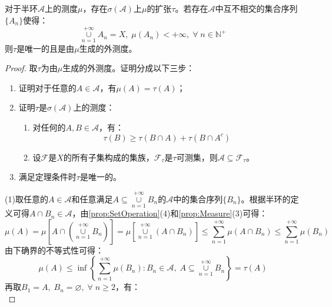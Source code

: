 \begin{theorem}\label{theo:SemiringMeasureExtension}
	对于半环$\mathscr{A}$上的测度$\mu$，存在$\sigma(\mathscr{A})$上$\mu$的扩张$\tau$。若存在$\mathscr{A}$中互不相交的集合序列$\{A_n\}$使得：
	\begin{equation*}
		\underset{n=1}{\overset{+\infty}{\cup}}A_n=X,\;\mu(A_n)<+\infty,\;\forall\;n\in\mathbb{N}^+
	\end{equation*}
	则$\tau$是唯一的且是由$\mu$生成的外测度。
\end{theorem}
\begin{proof}
	取$\tau$为由$\mu$生成的外测度。证明分成以下三步：
	\begin{enumerate}
		\item 证明对于任意的$A\in \mathscr{A}$，有$\mu(A)=\tau(A)$；
		\item 证明$\tau$是$\sigma(\mathscr{A})$上的测度：
		\begin{enumerate}
			\item 对任何的$A,B\in \mathscr{A}$，有：
			\begin{equation*}
				\tau(B)\geqslant\tau(B\cap A)+\tau(B\cap A^c)
			\end{equation*}
			\item 设$\mathscr{F}$是$X$的所有子集构成的集族，$\mathscr{F}_{\tau}$是$\tau$可测集，则$\mathscr{A}\subseteq\mathscr{F}_{\tau}$。
		\end{enumerate}
		\item 满足定理条件时$\tau$是唯一的。
	\end{enumerate}\par
	(1)取任意的$A\in \mathscr{A}$和任意满足$A\subseteq\underset{n=1}{\overset{+\infty}{\cup}}B_n$的$\mathscr{A}$中的集合序列$\{B_n\}$。根据半环的定义可得$A\cap B_n\in\mathscr{A}$，由\cref{prop:SetOperation}(4)和\cref{prop:Measure}(3)可得：
	\begin{equation*}
		\mu(A)=\mu\left[A\cap\left(\underset{n=1}{\overset{+\infty}{\cup}}B_n\right)\right]=\mu\left[\underset{n=1}{\overset{+\infty}{\cup}}(A\cap B_n)\right]\leqslant\sum_{n=1}^{+\infty}\mu(A\cap B_n)\leqslant\sum_{n=1}^{+\infty}\mu(B_n)
	\end{equation*}
	由下确界的不等式性可得：
	\begin{equation*}
		\mu(A)\leqslant\inf\left\{\sum_{n=1}^{+\infty}\mu(B_n):B_n\in\mathscr{A},\;A\subseteq\underset{n=1}{\overset{+\infty}{\cup}}B_n\right\}=\tau(A)
	\end{equation*}
	再取$B_1=A,\;B_n=\varnothing,\;\forall\;n\geqslant2$，有：
	\begin{equation*}

\end{equation*}
\end{proof}
